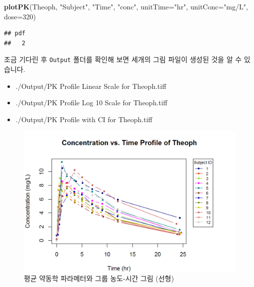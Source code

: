 \documentclass[12pt,]{krantz}
\newenvironment{Shaded}{\begin{snugshade}}{\end{snugshade}}
\newcommand{\KeywordTok}[1]{\textcolor[rgb]{0.13,0.29,0.53}{\textbf{#1}}}
\newcommand{\DataTypeTok}[1]{\textcolor[rgb]{0.13,0.29,0.53}{#1}}
\newcommand{\DecValTok}[1]{\textcolor[rgb]{0.00,0.00,0.81}{#1}}
\newcommand{\StringTok}[1]{\textcolor[rgb]{0.31,0.60,0.02}{#1}}
\newcommand{\NormalTok}[1]{#1}
\providecommand{\tightlist}{%
  \setlength{\itemsep}{0pt}\setlength{\parskip}{0pt}}
\theoremstyle{definition}
\theoremstyle{definition}
\theoremstyle{definition}
\theoremstyle{remark}
\begin{document}
\begin{Shaded}
\begin{Highlighting}[]
\KeywordTok{plotPK}\NormalTok{(Theoph, }\StringTok{"Subject"}\NormalTok{, }\StringTok{"Time"}\NormalTok{, }\StringTok{"conc"}\NormalTok{, }\DataTypeTok{unitTime=}\StringTok{"hr"}\NormalTok{, }\DataTypeTok{unitConc=}\StringTok{"mg/L"}\NormalTok{, }\DataTypeTok{dose=}\DecValTok{320}\NormalTok{)}
\end{Highlighting}
\end{Shaded}

\begin{verbatim}
## pdf 
##   2
\end{verbatim}

조금 기다린 후 \texttt{Output} 폴더를 확인해 보면 세개의 그림 파일이
생성된 것을 알 수 있습니다.

\begin{itemize}
\tightlist
\item
  ./Output/PK Profile Linear Scale for Theoph.tiff
\item
  ./Output/PK Profile Log 10 Scale for Theoph.tiff
\item
  ./Output/PK Profile with CI for Theoph.tiff
\end{itemize}

\begin{figure}
\includegraphics[width=1\linewidth]{Output/PK_Profile_Linear_Scale_for_Theoph} \caption{평균 약동학 파라메터와 그룹 농도-시간 그림 (선형)}\label{fig:unnamed-chunk-33}
\end{figure}
\end{document}
